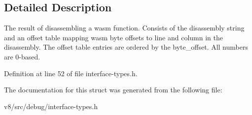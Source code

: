 \subsection{Detailed Description}
The result of disassembling a wasm function. Consists of the disassembly string and an offset table mapping wasm byte offsets to line and column in the disassembly. The offset table entries are ordered by the byte\+\_\+offset. All numbers are 0-\/based. 

Definition at line 52 of file interface-\/types.\+h.



The documentation for this struct was generated from the following file\+:\begin{DoxyCompactItemize}
\item 
v8/src/debug/interface-\/types.\+h\end{DoxyCompactItemize}
